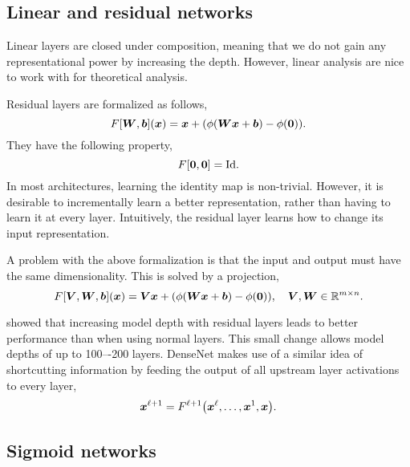 \subsection{Linear and residual networks}

Linear layers are closed under composition, meaning that we do not gain any representational power
by increasing the depth. However, linear analysis are nice to work with for theoretical analysis.

Residual layers are formalized as follows, \[
    F[\bm{W}, \bm{b}](\bm{x}) = \bm{x} + (\phi(\bm{W} \bm{x} + \bm{b}) - \phi(\bm{0})).
\]
They have the following property, \[
    F[\bm{0}, \bm{0}] = \mathrm{Id}.
\]
In most architectures, learning the identity map is non-trivial. However, it is desirable to
incrementally learn a better representation, rather than having to learn it at every layer.
Intuitively, the residual layer learns how to change its input representation.

A problem with the above formalization is that the input and output must have the same
dimensionality. This is solved by a projection, \[
    F[\bm{V}, \bm{W}, \bm{b}](\bm{x}) = \bm{V} \bm{x} + (\phi(\bm{W} \bm{x} + \bm{b}) - \phi(\bm{0})), \quad \bm{V}, \bm{W} \in \mathbb{R}^{m\times n}.
\]

\citet{he2016deep} showed that increasing model depth with residual layers leads to better
performance than when using normal layers. This small change allows model depths of up to 100–-200
layers. DenseNet \citet{zhu2017densenet} makes use of a similar idea of shortcutting information by
feeding the output of all upstream layer activations to every layer, \[
    \vec{x}^{\ell+1} = F^{\ell+1}\lft( \vec{x}^\ell, \ldots, \vec{x}^1, \vec{x} \rgt).
\]

\subsection{Sigmoid networks}


